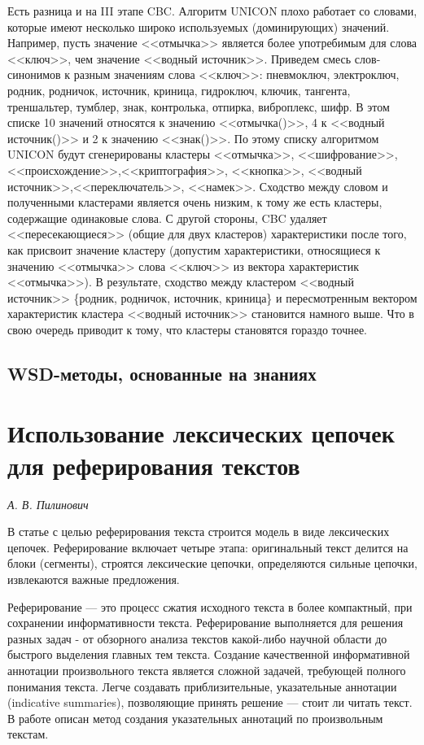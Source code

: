 \documentclass{article}
\begin{document}
\begin{articletext}
Есть разница и на III этапе CBC. Алгоритм UNICON плохо работает со словами, которые имеют несколько широко используемых (доминирующих) значений. Например, пусть значение <<отмычка>> является более употребимым для слова <<ключ>>, чем значение <<водный источник>>. Приведем смесь слов-синонимов к разным значениям слова <<ключ>>: пневмоключ, электроключ, родник, родничок, источник, криница, гидроключ, ключик, тангента, треншальтер, тумблер, знак, контролька, отпирка, виброплекс, шифр. В этом списке 10 значений относятся к значению <<отмычка()>>, 4 к <<водный источник()>> и 2 к значению <<знак()>>. По этому списку алгоритмом UNICON будут сгенерированы кластеры <<отмычка>>, <<шифрование>>, <<происхождение>>,<<криптография>>, <<кнопка>>, <<водный источник>>,<<переключатель>>, <<намек>>. Сходство между словом и полученными кластерами  является очень низким, к тому же есть кластеры, содержащие одинаковые слова. С другой стороны, CBC удаляет <<пересекающиеся>> (общие для двух кластеров) характеристики после того, как присвоит значение кластеру (допустим характеристики, относящиеся к значению <<отмычка>> слова <<ключ>> из вектора характеристик <<отмычка>>). В результате, сходство между  кластером <<водный источник>> \{родник, родничок, источник, криница\} и пересмотренным вектором характеристик кластера <<водный источник>> становится намного выше. Что в свою очередь приводит к тому, что кластеры становятся гораздо точнее.

\bfullwidth
\begin{center}
\section{WSD-методы, основанные на знаниях}
\end{center}
\efullwidth

\section{Использование лексических цепочек для реферирования текстов}
\begin{flushright}
\textit{А. В. Пилинович} 
\end{flushright}

В статье \cite{Barzilay Elhadad 1997} с целью реферирования текста строится модель в виде лексических цепочек. Реферирование включает четыре этапа: оригинальный текст делится на блоки (сегменты), строятся лексические цепочки, определяются сильные цепочки, извлекаются важные предложения.

Реферирование --- это процесс сжатия исходного текста в более компактный, при сохранении информативности текста. Реферирование выполняется для решения разных задач - от обзорного анализа текстов какой-либо научной области до быстрого выделения главных тем текста. Создание качественной информативной аннотации произвольного текста является сложной задачей, требующей полного понимания текста. Легче создавать  приблизительные, указательные аннотации (indicative summaries), позволяющие принять решение --- стоит ли читать текст. В работе \cite{Barzilay Elhadad 1997} описан метод создания указательных аннотаций по произвольным текстам.


\end{articletext}
\end{document}
